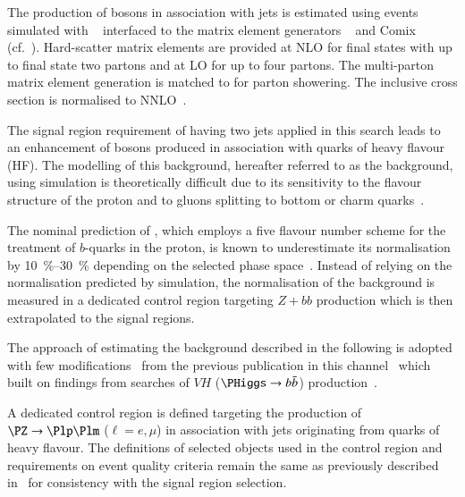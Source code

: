 %
%

The production of \PZ bosons in association with jets is estimated
using events simulated with \SHERPA[2.2.1]~\cite{Bothmann:2019yzt}
interfaced to the matrix element generators
\OPENLOOPS~\cite{Buccioni:2019sur,Cascioli:2011va,Denner:2016kdg} and
Comix~\cite{Gleisberg:2008fv} (cf.\
). Hard-scatter matrix elements are
provided at NLO for final states with up to final state two partons
and at LO for up to four partons. The multi-parton matrix element
generation is matched to \SHERPA for parton showering. The inclusive
cross section is normalised to NNLO~\cite{Anastasiou:2003ds}.

The signal region requirement of having two \btagged jets applied in
this search leads to an enhancement of \PZ bosons produced in
association with quarks of heavy flavour (HF). The modelling of this
background, hereafter referred to as the \ZHF background, using
simulation is theoretically difficult due to its sensitivity to the
flavour structure of the proton and to gluons splitting to bottom or
charm
quarks~\cite{Maltoni:2012pa,Napoletano:2018euk,Napoletano:2019tla}.

The nominal \ZHF prediction of \SHERPA, which employs a five flavour
number scheme for the treatment of $b$-quarks in the proton, is known
to underestimate its normalisation by \SIrange{10}{30}{\percent}
depending on the selected phase space~\cite{STDM-2017-38}. Instead of
relying on the normalisation predicted by simulation, the
normalisation of the \ZHF background is measured in a dedicated
control region targeting $Z + bb$ production which is then
extrapolated to the signal regions.

The approach of estimating the \ZHF background described in the
following is adopted with few modifications~\cite{bokan} from the
previous publication in this channel~\cite{HIGG-2016-16-witherratum}
which built on findings from searches of $VH$ ($\PHiggs \to \bbbar$)
production~\cite{HIGG-2016-29}.

A dedicated control region is defined targeting the production of
$\PZ \ra \Plp\Plm$ ($\ell = e , \mu$) in association with jets
originating from quarks of heavy flavour. The definitions of selected
objects used in the control region and requirements on event quality
criteria remain the same as previously described
in~ for
consistency with the signal region selection.

